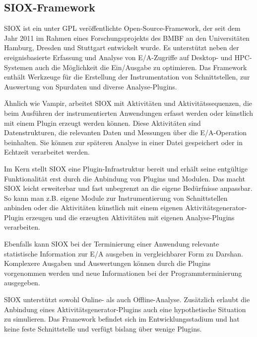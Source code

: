 \subsection{SIOX-Framework}

SIOX \cite{siox_arch} ist ein unter GPL veröffentlichte Open-Source-Framework, der seit dem Jahr 2011 im Rahmen eines Forschungsprojekts des BMBF an den Universitäten Hamburg, Dresden und Stuttgart entwickelt wurde.
Es unterstützt neben der ereignisbasierte Erfassung und Analyse von E/A-Zugriffe auf Desktop- und HPC-Systemen auch die Möglichkeit die Ein/Ausgabe zu optimieren. 
Das Framework enthält Werkzeuge für die Erstellung der Instrumentation von Schnittstellen, zur Auswertung von Spurdaten und diverse Analyse-Plugins. 

Ähnlich wie Vampir, arbeitet SIOX mit Aktivitäten und Aktivitätssequenzen, die beim Ausführen der instrumentierten Anwendungen erfasst werden oder künstlich mit einem Plugin erzeugt werden können. 
Diese Aktivitäten sind Datenstrukturen, die relevanten Daten und Messungen über die E/A-Operation beinhalten. 
Sie können zur späteren Analyse in einer Datei gespeichert oder in Echtzeit verarbeitet werden.

Im Kern stellt SIOX eine Plugin-Infrastruktur bereit und erhält seine entgültige Funktionalität erst durch die Anbindung von Plugins und Modulen. 
Das macht SIOX leicht erweiterbar und fast unbegrenzt an die eigene Bedürfnisse anpassbar. 
So kann man z.B. eigene Module zur Instrumentierung von Schnittstellen anbinden oder die Aktivitäten künstlich mit einem eigenen Aktivitätsgenerator-Plugin erzeugen und die erzeugten Aktivitäten mit eigenen Analyse-Plugins verarbeiten.

Ebenfalls kann SIOX bei der Terminierung einer Anwendung relevante statistische Information zur E/A ausgeben in vergleichbarer Form zu Darshan.
Komplexere Ausgaben und Auswertungen können durch die Plugins vorgenommen werden und neue Informationen bei der Programmterminierung ausgegeben.

SIOX unterstützt sowohl Online- als auch Offline-Analyse. 
Zusätzlich erlaubt die Anbindung eines Aktivitätsgenerator-Plugins auch eine hypothetische Situation zu simulieren. 
Das Framework befindet sich im Entwicklungsstadium und hat keine feste Schnittstelle und verfügt bislang über wenige Plugins.



